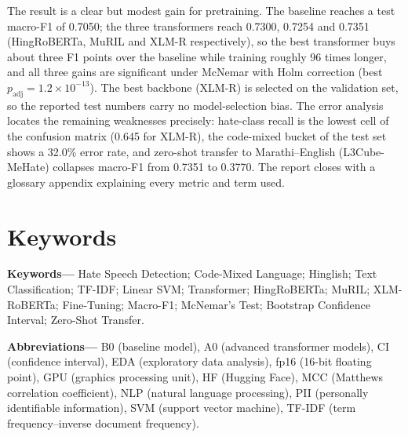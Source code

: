 \documentclass[11pt,a4paper]{report}
\begin{document}
The result is a clear but modest gain for pretraining. The baseline reaches a test
macro-F1 of 0.7050; the three transformers reach 0.7300, 0.7254 and 0.7351
(HingRoBERTa, MuRIL and XLM-R respectively), so the best transformer buys about
three F1 points over the baseline while training roughly 96 times longer, and all
three gains are significant under McNemar with Holm correction (best
$p_{\mathrm{adj}} = 1.2\times10^{-13}$). The best backbone (XLM-R) is selected on the
validation set, so the reported test numbers carry no model-selection bias. The
error analysis locates the remaining weaknesses precisely: hate-class recall is the
lowest cell of the confusion matrix (0.645 for XLM-R), the code-mixed bucket of the
test set shows a 32.0\% error rate, and zero-shot transfer to Marathi--English
(L3Cube-MeHate) collapses macro-F1 from 0.7351 to 0.3770. The report closes with
a glossary appendix explaining every metric and term used.
\endgroup

{\let\clearpage\relax\chapter*{Keywords}}
\vspace{-2mm}
\noindent\textbf{Keywords---} Hate Speech Detection; Code-Mixed Language; Hinglish;
Text Classification; TF-IDF; Linear SVM; Transformer; HingRoBERTa; MuRIL; XLM-RoBERTa;
Fine-Tuning; Macro-F1; McNemar's Test; Bootstrap Confidence Interval; Zero-Shot Transfer.

\vspace{5mm}
\noindent\textbf{Abbreviations---} B0 (baseline model), A0 (advanced transformer
models), CI (confidence interval), EDA (exploratory data analysis), fp16
(16-bit floating point), GPU (graphics processing unit), HF (Hugging Face),
MCC (Matthews correlation coefficient), NLP (natural language processing),
PII (personally identifiable information), SVM (support vector machine),
TF-IDF (term frequency--inverse document frequency).

\begingroup
\footnotesize
{}
\setlength{\parskip}{0pt}

\setcounter{tocdepth}{1}
\tableofcontents

\clearpage
\listoftables

\listoffigures
\endgroup









\end{document}
